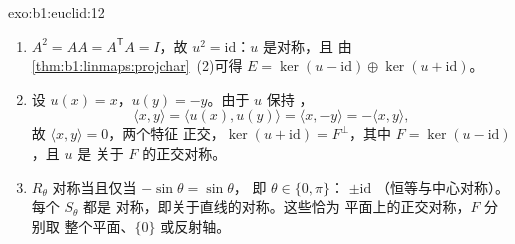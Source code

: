 \begin{solution}{exo:b1:euclid:12}
\begin{enumerate}
  \item $A^2 = A A = A^{\mathsf T} A = I$，故 $u^2 =
        \mathrm{id}$：$u$ 是对称，且
        由\cref{thm:b1:linmaps:projchar}~(2)可得 $E = \ker(u -
        \mathrm{id}) \oplus \ker(u + \mathrm{id})$。
  \item 设 $u(x) = x$，$u(y) = -y$。由于 $u$ 保持
        ，
        \[
        \langle x, y\rangle = \langle u(x), u(y)\rangle
        = \langle x, -y\rangle = -\langle x, y\rangle ,
        \]
        故 $\langle x, y\rangle = 0$，两个特征
        正交，$\ker(u + \mathrm{id}) = F^\perp$，其中 $F =
        \ker(u - \mathrm{id})$，且 $u$ 是
        关于 $F$ 的正交对称。
  \item $R_\theta$ 对称当且仅当 $-\sin\theta = \sin\theta$，
        即 $\theta \in \{0, \pi\}$： $\pm\mathrm{id}$
        （恒等与中心对称）。每个 $S_\theta$ 都是
        对称，即关于直线的对称。这些恰为
        平面上的正交对称，$F$ 分别取
        整个平面、$\{0\}$ 或反射轴。
\end{enumerate}
\end{solution}

